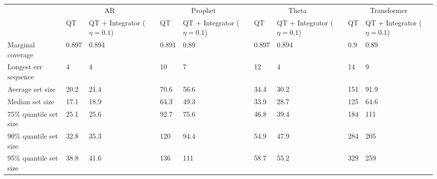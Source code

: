 \begin{tabular}{lllllllll}
\toprule
& \multicolumn{2}{c}{AR}& \multicolumn{2}{c}{Prophet}& \multicolumn{2}{c}{Theta}& \multicolumn{2}{c}{Transformer} \\
& QT & QT + Integrator ($\eta=0.1$) & QT & QT + Integrator ($\eta=0.1$) & QT & QT + Integrator ($\eta=0.1$) & QT & QT + Integrator ($\eta=0.1$) \\
\midrule
Marginal coverage & 0.897 & 0.894 & 0.891 & 0.89 & 0.897 & 0.894 & 0.9 & 0.89 \\
Longest err sequence & 4 & 4 & 10 & 7 & 12 & 4 & 14 & 9 \\
Average set size & 20.2 & 21.4 & 70.6 & 56.6 & 34.4 & 30.2 & 151 & 91.9 \\
Median set size & 17.1 & 18.9 & 64.3 & 49.3 & 33.9 & 28.7 & 125 & 64.6 \\
75\% quantile set size & 25.1 & 25.6 & 92.7 & 75.6 & 46.8 & 39.4 & 184 & 111 \\
90\% quantile set size & 32.8 & 35.3 & 120 & 94.4 & 54.9 & 47.9 & 284 & 205 \\
95\% quantile set size & 38.8 & 41.6 & 136 & 111 & 58.7 & 55.2 & 329 & 259 \\
\bottomrule
\end{tabular}
